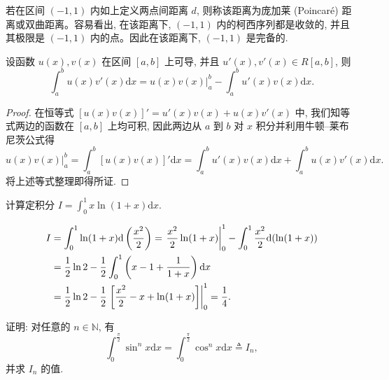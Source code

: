 \begin{remark}\label{remark:ma-7-source-69}
若在区间 $(-1,1)$ 内如上定义两点间距离 $d$, 则称该距离为庞加莱 (Poincaré) 距离或双曲距离。容易看出, 在该距离下, $(-1,1)$ 内的柯西序列都是收敛的, 并且其极限是 $(-1,1)$ 内的点。因此在该距离下, $(-1,1)$ 是完备的.
\end{remark}


\begin{theorem}[{分部积分法}]\label{theorem:ma-7-4-3}
设函数 $u(x),v(x)$ 在区间 $[a,b]$ 上可导, 并且 $u'(x),v'(x)\in R[a,b]$, 则
\[
  \int_a^b u(x)v'(x)\mathrm dx
  =\left.u(x)v(x)\right|_a^b-\int_a^b u'(x)v(x)\mathrm dx.
\]
\end{theorem}


\begin{proof}
在恒等式 $[u(x)v(x)]'=u'(x)v(x)+u(x)v'(x)$ 中, 我们知等式两边的函数在 $[a,b]$ 上均可积, 因此两边从 $a$ 到 $b$ 对 $x$ 积分并利用牛顿--莱布尼茨公式得
\[
  \left.u(x)v(x)\right|_a^b
  =\int_a^b [u(x)v(x)]'\mathrm dx
  =\int_a^b u'(x)v(x)\mathrm dx+\int_a^b u(x)v'(x)\mathrm dx.
\]
将上述等式整理即得所证.
\end{proof}


\begin{example}\label{example:ma-7-4-9}
计算定积分 $I=\int_0^1 x\ln(1+x)\mathrm dx$.
\end{example}


\begin{solve}
\[
\begin{aligned}
  I&=\int_0^1 \ln(1+x)\mathrm d\left(\frac{x^2}{2}\right)
  =\left.\frac{x^2}{2}\ln(1+x)\right|_0^1
  -\int_0^1 \frac{x^2}{2}\mathrm d(\ln(1+x))\\
  &=\frac{1}{2}\ln2-\frac{1}{2}\int_0^1\left(x-1+\frac{1}{1+x}\right)\mathrm dx\\
  &=\frac{1}{2}\ln2-\frac{1}{2}\left.\left[\frac{x^2}{2}-x+\ln(1+x)\right]\right|_0^1
  =\frac{1}{4}.
\end{aligned}
\qedhere
\]
\end{solve}


\begin{example}\label{example:ma-7-4-10}
证明: 对任意的 $n\in\mathbb N$, 有
\[
  \int_0^{\frac{\pi}{2}}\sin^n x\mathrm dx
  =\int_0^{\frac{\pi}{2}}\cos^n x\mathrm dx\triangleq I_n,
\]
并求 $I_n$ 的值.
\end{example}


